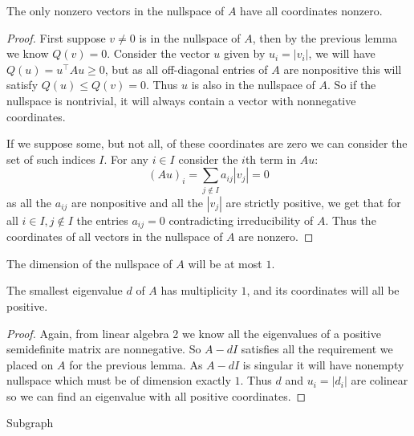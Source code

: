 \documentclass[../main.tex]{subfiles}
\begin{document}
\begin{lemma}
    The only nonzero vectors in the nullspace of $A$ have all coordinates nonzero.
    \begin{proof}
        First suppose $v\neq 0$ is in the nullspace of $A$, then by the previous lemma we know $Q(v)=0$. Consider the vector $u$ given by $u_i = |v_i|$, we will have $Q(u) = u^\top A u \geq 0$, but as all off-diagonal entries of $A$ are nonpositive this will satisfy $Q(u)\leq Q(v) = 0$. Thus $u$ is also in the nullspace of $A$. So if the nullspace is nontrivial, it will always contain a vector with nonnegative coordinates. 

        If we suppose some, but not all, of these coordinates are zero we can consider the set of such indices $I$. For any $i\in I$ consider the $i$th term in $Au$:\[
            (Au)_i = \sum_{j\notin I}a_{ij} |v_j| = 0
        \] as all the $a_{ij}$ are nonpositive and all the $|v_j|$ are strictly positive, we get that for all $i\in I, j\notin I$ the entries $a_{ij}=0$ contradicting irreducibility of $A$. Thus the coordinates of all vectors in the nullspace of $A$ are nonzero.
    \end{proof}
\end{lemma}

\begin{corollary}
    The dimension of the nullspace of $A$ will be at most $1$.
\end{corollary}

\begin{lemma}
    The smallest eigenvalue $d$ of $A$ has multiplicity $1$, and its coordinates will all be positive.
    \begin{proof}
        Again, from linear algebra 2 we know all the eigenvalues of a positive semidefinite matrix are nonnegative. So $A-dI$ satisfies all the requirement we placed on $A$ for the previous lemma. As $A-dI$ is singular it will have nonempty nullspace which must be of dimension exactly $1$. Thus $d$ and $u_i = |d_i|$ are colinear so we can find an eigenvalue with all positive coordinates.
    \end{proof}
\end{lemma}

\begin{definition}
    Subgraph
\end{definition}
\end{document}
